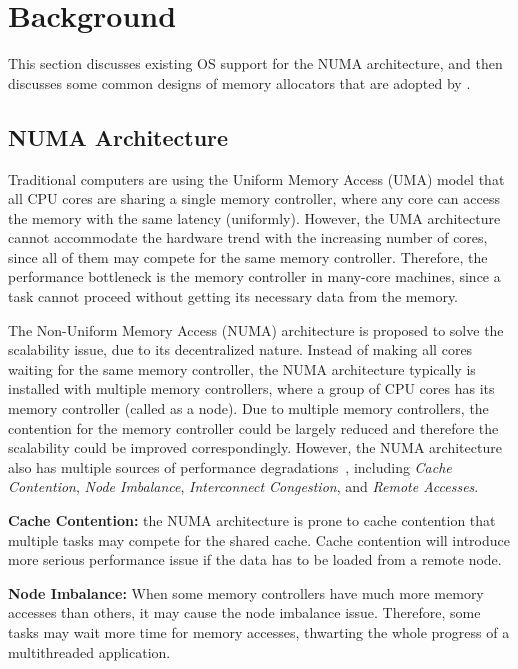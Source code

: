 \section{Background}
\label{sec:overview}

This section discusses existing OS support for the NUMA architecture, and then discusses some common designs of memory allocators that are adopted by \NM{}.  

\subsection{NUMA Architecture}

\label{sec:numa}

Traditional computers are using the Uniform Memory Access (UMA) model that all CPU cores are sharing a single memory controller, where any core can access the memory with the same latency (uniformly). However, the UMA architecture cannot accommodate the hardware trend with the increasing number of cores, since all of them may compete for the same memory controller. Therefore, the performance bottleneck is the memory controller in many-core machines, since a task cannot proceed without getting its necessary data from the memory. 

The Non-Uniform Memory Access (NUMA) architecture is proposed to solve the scalability issue, due to its decentralized nature. Instead of making all cores waiting for the same memory controller, the NUMA architecture typically is installed with multiple memory controllers, where a group of CPU cores has its memory controller (called as a node). Due to multiple memory controllers, the contention for the memory controller could be largely reduced and therefore the scalability could be improved correspondingly. However, the NUMA architecture also has multiple sources of performance degradations~\cite{Blagodurov:2011:CNC:2002181.2002182}, including \textit{Cache Contention}, \textit{Node Imbalance}, \textit{Interconnect Congestion}, and \textit{Remote Accesses}. 

\textbf{Cache Contention:} the NUMA architecture is prone to cache contention that multiple tasks may compete for the shared cache. Cache contention will introduce more serious performance issue if the data has to be loaded from a remote node. 
 
\textbf{Node Imbalance:} When some memory controllers have much more memory accesses than others, it may cause the node imbalance issue. Therefore, some tasks may wait more time for memory accesses, thwarting the whole progress of a multithreaded application.  

